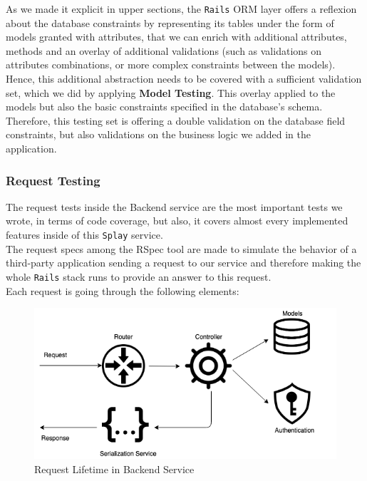 \documentclass{eplmastersthesis}
\begin{document}
          As we made it explicit in upper sections, the \texttt{Rails} ORM layer offers
          a reflexion about the database constraints by representing its
          tables under the form of models granted with attributes, that we can
          enrich with additional attributes, methods and an overlay of
          additional validations (such as validations on attributes
          combinations, or more complex constraints between the models).\\

          Hence, this additional abstraction needs to be covered with a
          sufficient validation set, which we did by applying
          \textbf{Model Testing}. This overlay applied to the
          models but also the basic constraints specified in the database's
          schema.\\

          Therefore, this testing set is offering a double validation on the
          database field constraints, but also validations on the business
          logic we added in the application.

        \subsubsection{Request Testing}

          The request tests inside the Backend service are the most important
          tests we wrote, in terms of code coverage, but also, it covers almost
          every implemented features inside of this \texttt{Splay} service.\\

          The request specs among the RSpec tool are made to simulate
          the behavior of a third-party application sending a request to
          our service and therefore making the whole \texttt{Rails} stack runs
          to provide an answer to this request.\\
          Each request is going through the following elements:\\

          \begin{figure}[H]
            \centering
            \includegraphics[scale=0.6]{figures/request_test.png}
            \caption{\label{request_test} Request Lifetime in Backend Service}
          \end{figure}
\end{document}
